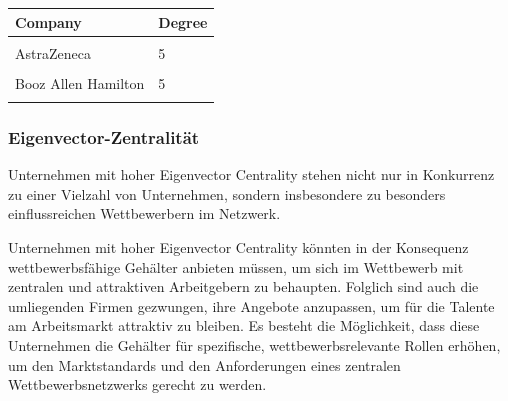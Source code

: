 \documentclass[
]{article}
\begin{document}
\begin{tabular}{ll}
\toprule
Company & Degree\\
\midrule
\cellcolor{gray!10}{Accenture} & \cellcolor{gray!10}{7}\\
AstraZeneca & 5\\
\cellcolor{gray!10}{Infosys} & \cellcolor{gray!10}{5}\\
Booz Allen Hamilton & 5\\
\cellcolor{gray!10}{BioMarin Pharmaceutical} & \cellcolor{gray!10}{4}\\
\bottomrule
\end{tabular}

\subsubsection{Eigenvector-Zentralität}\label{eigenvector-zentralituxe4t}

Unternehmen mit hoher Eigenvector Centrality stehen nicht nur in
Konkurrenz zu einer Vielzahl von Unternehmen, sondern insbesondere zu
besonders einflussreichen Wettbewerbern im Netzwerk.

Unternehmen mit hoher Eigenvector Centrality könnten in der Konsequenz
wettbewerbsfähige Gehälter anbieten müssen, um sich im Wettbewerb mit
zentralen und attraktiven Arbeitgebern zu behaupten. Folglich sind auch
die umliegenden Firmen gezwungen, ihre Angebote anzupassen, um für die
Talente am Arbeitsmarkt attraktiv zu bleiben. Es besteht die
Möglichkeit, dass diese Unternehmen die Gehälter für spezifische,
wettbewerbsrelevante Rollen erhöhen, um den Marktstandards und den
Anforderungen eines zentralen Wettbewerbsnetzwerks gerecht zu werden.
\end{document}
